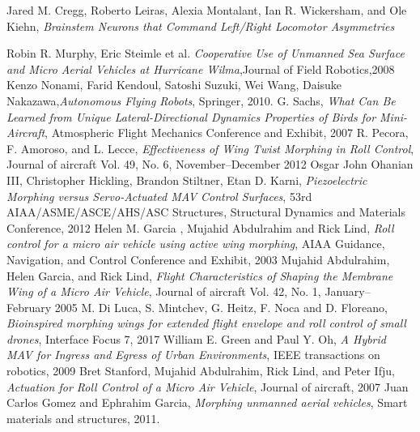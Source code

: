 \documentclass[12pt,a4paper]{article}
\begin{document}
\clearpage
\lhead{ }
\begin{thebibliography}{100}
	
	Jared M. Cregg, Roberto Leiras, Alexia Montalant, Ian R. Wickersham, and Ole Kiehn, \textit{Brainstem Neurons that Command Left/Right Locomotor Asymmetries} 
	
	
	 Robin R. Murphy, Eric Steimle et al. \textit{Cooperative Use of Unmanned Sea Surface and Micro Aerial Vehicles at Hurricane Wilma},Journal of Field Robotics,2008
	     Kenzo Nonami, Farid Kendoul, Satoshi Suzuki, Wei Wang, Daisuke Nakazawa,\textit{Autonomous Flying Robots}, Springer, 2010.
	 G. Sachs, \textit{What Can Be Learned from Unique Lateral-Directional Dynamics Properties of Birds for Mini-Aircraft}, Atmospheric Flight Mechanics Conference and Exhibit, 2007
	 R. Pecora, F. Amoroso, and L. Lecce, \textit{Effectiveness of Wing Twist Morphing in Roll Control}, Journal of aircraft Vol. 49, No. 6, November–December 2012
	 Osgar John Ohanian III, Christopher Hickling, Brandon Stiltner, Etan D. Karni, \textit{Piezoelectric Morphing versus Servo-Actuated MAV Control Surfaces}, 53rd AIAA/ASME/ASCE/AHS/ASC Structures, Structural Dynamics and Materials Conference, 2012
	 Helen M. Garcia , Mujahid Abdulrahim and Rick Lind, \textit{Roll control for a micro air vehicle using active wing morphing}, AIAA Guidance, Navigation, and Control Conference and Exhibit, 2003
	 Mujahid Abdulrahim, Helen Garcia, and Rick Lind, \textit{Flight Characteristics of Shaping the Membrane Wing of a Micro Air Vehicle}, Journal of aircraft Vol. 42, No. 1, January–February 2005
	 M. Di Luca, S. Mintchev, G. Heitz, F. Noca and D. Floreano, \textit{Bioinspired morphing wings for extended flight envelope and roll control of small drones}, Interface Focus 7, 2017
	 William E. Green and Paul Y. Oh, \textit{A Hybrid MAV for Ingress and Egress of Urban Environments}, IEEE transactions on robotics, 2009
	 Bret Stanford, Mujahid Abdulrahim, Rick Lind, and Peter Ifju, \textit{Actuation for Roll Control of a Micro Air Vehicle}, Journal of aircraft,  2007
	 Juan Carlos Gomez and Ephrahim Garcia, \textit{Morphing unmanned aerial vehicles}, Smart materials and structures, 2011.

\end{thebibliography}
\end{document}

